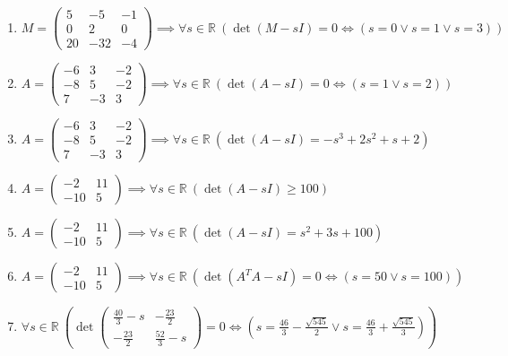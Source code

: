 \documentclass[11pt,a4paper]{article}
\begin{document}
\begin{enumerate}
\item $\displaystyle M = \begin{pmatrix} 5 & -5 & -1 \\ 0 & 2 & 0 \\ 20 & -32 & -4 \end{pmatrix} \implies \forall s \in \mathbb{R}\ \left( \det\left( M - sI \right) = 0 \iff \left( s = 0 \lor s = 1 \lor s = 3 \right) \right)$
\item $\displaystyle A = \begin{pmatrix} -6 & 3 & -2 \\ -8 & 5 & -2 \\ 7 & -3 & 3 \end{pmatrix} \implies \forall s \in \mathbb{R}\ \left( \det\left( A - sI \right) = 0 \iff \left( s = 1 \lor s = 2 \right) \right)$
\item $\displaystyle A = \begin{pmatrix} -6 & 3 & -2 \\ -8 & 5 & -2 \\ 7 & -3 & 3 \end{pmatrix} \implies \forall s \in \mathbb{R}\ \left( \det\left( A - sI \right) = -s^{3} + 2s^{2} + s + 2 \right)$
\item $\displaystyle A = \begin{pmatrix} -2 & 11 \\ -10 & 5 \end{pmatrix} \implies \forall s \in \mathbb{R}\ \left( \det\left( A - sI \right) \ge 100 \right)$
\item $\displaystyle A = \begin{pmatrix} -2 & 11 \\ -10 & 5 \end{pmatrix} \implies \forall s \in \mathbb{R}\ \left( \det\left( A - sI \right) = s^{2} + 3s + 100 \right)$
\item $\displaystyle A = \begin{pmatrix} -2 & 11 \\ -10 & 5 \end{pmatrix} \implies \forall s \in \mathbb{R}\ \left( \det\left( A^{T} A - sI \right) = 0 \iff \left( s = 50 \lor s = 100 \right) \right)$
\item $\displaystyle \forall s \in \mathbb{R}\ \left( \det \begin{pmatrix} \frac{40}{3} - s & -\frac{23}{2} \\ -\frac{23}{2} & \frac{52}{3} - s \end{pmatrix} = 0 \iff \left( s = \frac{46}{3} - \frac{\sqrt{545}}{2} \lor s = \frac{46}{3} + \frac{\sqrt{545}}{3} \right) \right)$

\end{enumerate}
\end{document}
